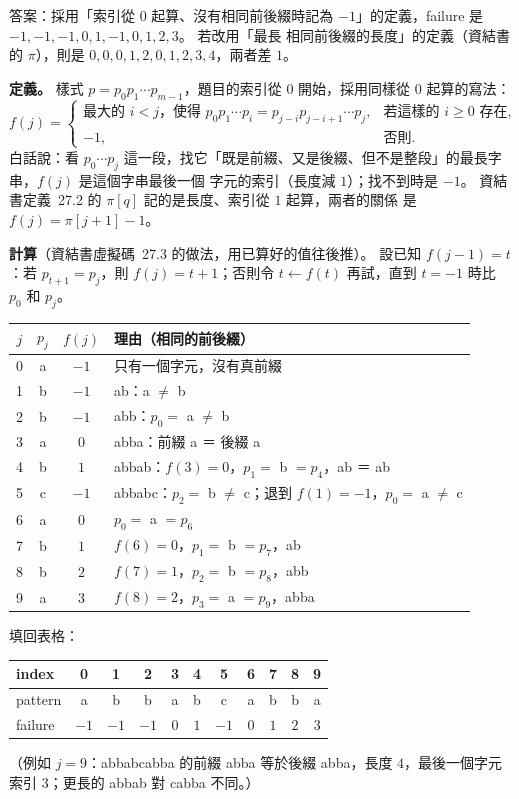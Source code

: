\begin{pastsoln}
答案：採用「索引從 $0$ 起算、沒有相同前後綴時記為 $-1$」的定義，failure 是 $-1, -1, -1, 0, 1, -1, 0, 1, 2, 3$。 若改用「最長
相同前後綴的長度」的定義（資結書的 $\pi$），則是 $0, 0, 0, 1, 2, 0, 1, 2, 3, 4$，兩者差 $1$。

\textbf{定義。} 樣式 $p = p_0 p_1 \cdots p_{m-1}$，題目的索引從 $0$ 開始，採用同樣從 $0$ 起算的寫法：
\[
f(j) = \begin{cases}
\text{最大的 } i < j \text{，使得 } p_0 p_1 \cdots p_i = p_{j-i} p_{j-i+1} \cdots p_j, & \text{若這樣的 } i \ge 0 \text{ 存在},\\
-1, & \text{否則}.
\end{cases}
\]
白話說：看 $p_0 \cdots p_j$ 這一段，找它「既是前綴、又是後綴、但不是整段」的最長字串，$f(j)$ 是這個字串最後一個
字元的索引（長度減 $1$）；找不到時是 $-1$。 資結書定義~27.2 的 $\pi[q]$ 記的是長度、索引從 $1$ 起算，兩者的關係
是 $f(j) = \pi[j + 1] - 1$。

\textbf{計算}（資結書虛擬碼~27.3 的做法，用已算好的值往後推）。 設已知 $f(j-1) = t$：若 $p_{t+1} = p_j$，則
$f(j) = t + 1$；否則令 $t \gets f(t)$ 再試，直到 $t = -1$ 時比 $p_0$ 和 $p_j$。
\begin{center}
\small
\begin{tabular}{cccl}
\toprule
$j$ & $p_j$ & $f(j)$ & 理由（相同的前後綴） \\
\midrule
0 & a & $-1$ & 只有一個字元，沒有真前綴 \\
1 & b & $-1$ & ab：a $\ne$ b \\
2 & b & $-1$ & abb：$p_0 = $ a $\ne$ b \\
3 & a & $0$ & abba：前綴 a ＝ 後綴 a \\
4 & b & $1$ & abbab：$f(3) = 0$，$p_1 = $ b $= p_4$，ab ＝ ab \\
5 & c & $-1$ & abbabc：$p_2 = $ b $\ne$ c；退到 $f(1) = -1$，$p_0 = $ a $\ne$ c \\
6 & a & $0$ & $p_0 = $ a $= p_6$ \\
7 & b & $1$ & $f(6) = 0$，$p_1 = $ b $= p_7$，ab \\
8 & b & $2$ & $f(7) = 1$，$p_2 = $ b $= p_8$，abb \\
9 & a & $3$ & $f(8) = 2$，$p_3 = $ a $= p_9$，abba \\
\bottomrule
\end{tabular}
\end{center}
填回表格：
\begin{center}
\begin{tabular}{|l|*{10}{c|}}
\hline
index & 0 & 1 & 2 & 3 & 4 & 5 & 6 & 7 & 8 & 9 \\ \hline
pattern & a & b & b & a & b & c & a & b & b & a \\ \hline
failure & $-1$ & $-1$ & $-1$ & $0$ & $1$ & $-1$ & $0$ & $1$ & $2$ & $3$ \\ \hline
\end{tabular}
\end{center}
（例如 $j = 9$：abbabcabba 的前綴 abba 等於後綴 abba，長度 $4$，最後一個字元索引 $3$；更長的 abbab 對 cabba 不同。）


\end{pastsoln}
